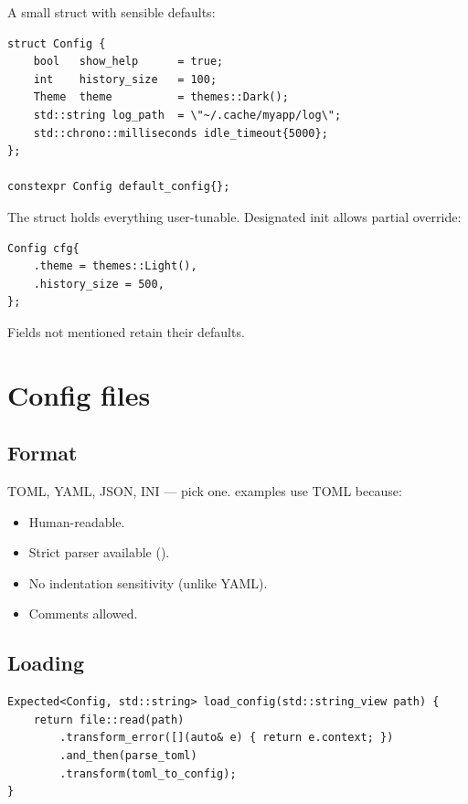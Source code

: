 A small struct with sensible defaults:

\begin{lstlisting}
struct Config {
    bool   show_help      = true;
    int    history_size   = 100;
    Theme  theme          = themes::Dark();
    std::string log_path  = \"~/.cache/myapp/log\";
    std::chrono::milliseconds idle_timeout{5000};
};

constexpr Config default_config{};
\end{lstlisting}

The struct holds everything user-tunable. Designated init
allows partial override:

\begin{lstlisting}
Config cfg{
    .theme = themes::Light(),
    .history_size = 500,
};
\end{lstlisting}

Fields not mentioned retain their defaults.

\section{Config files}

\subsection*{Format}

TOML, YAML, JSON, INI --- pick one. \maya{} examples use TOML
because:

\begin{itemize}[leftmargin=*]
  \item Human-readable.
  \item Strict parser available ().
  \item No indentation sensitivity (unlike YAML).
  \item Comments allowed.
\end{itemize}

\subsection*{Loading}

\begin{lstlisting}
Expected<Config, std::string> load_config(std::string_view path) {
    return file::read(path)
        .transform_error([](auto& e) { return e.context; })
        .and_then(parse_toml)
        .transform(toml_to_config);
}
\end{lstlisting}

